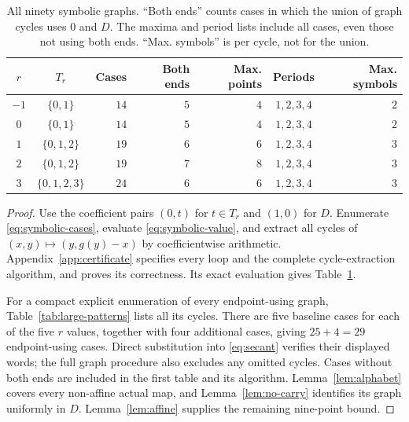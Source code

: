 \begin{table}[htbp]
\centering\small
\begin{tabular}{@{}c c r r r c r@{}}
\toprule
$r$ & $T_r$ & Cases & Both ends & Max. points & Periods & Max. symbols\\
\midrule
$-1$ & $\{0,1\}$ & $14$ & $5$ & $4$ & $1,2,3,4$ & $2$\\
$0$ & $\{0,1\}$ & $14$ & $5$ & $4$ & $1,2,3,4$ & $2$\\
$1$ & $\{0,1,2\}$ & $19$ & $6$ & $6$ & $1,2,3,4$ & $3$\\
$2$ & $\{0,1,2\}$ & $19$ & $7$ & $8$ & $1,2,3,4$ & $3$\\
$3$ & $\{0,1,2,3\}$ & $24$ & $6$ & $6$ & $1,2,3,4$ & $3$\\
\bottomrule
\end{tabular}
\caption{All ninety symbolic graphs. ``Both ends'' counts cases in
which the union of graph cycles uses $0$ and $D$. The maxima and
period lists include all cases, even those not using both ends.
``Max. symbols'' is per cycle, not for the union.}
\label{tab:large}
\end{table}

\begin{proof}
Use the coefficient pairs $(0,t)$ for $t\in T_r$ and $(1,0)$ for
$D$. Enumerate \eqref{eq:symbolic-cases}, evaluate
\eqref{eq:symbolic-value}, and extract all cycles of
$(x,y)\mapsto(y,g(y)-x)$ by coefficientwise arithmetic.
Appendix~\ref{app:certificate} specifies every loop and the complete
cycle-extraction algorithm, and proves its correctness.
Its exact evaluation gives Table~\ref{tab:large}.

For a compact explicit enumeration of every endpoint-using graph,
Table~\ref{tab:large-patterns} lists all its cycles. There are five
baseline cases for each of the five $r$ values, together with four
additional cases, giving $25+4=29$ endpoint-using cases. Direct
substitution into \eqref{eq:secant} verifies their displayed words;
the full graph procedure also excludes any omitted cycles. Cases
without both ends are included in the first table and its algorithm.
Lemma~\ref{lem:alphabet} covers every non-affine actual map, and
Lemma~\ref{lem:no-carry} identifies its graph uniformly in $D$.
Lemma~\ref{lem:affine} supplies the remaining nine-point bound.
\end{proof}

